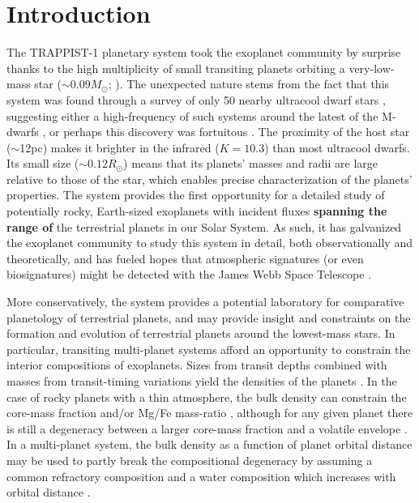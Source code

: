 \documentclass[twocolumn]{aastex63}
\begin{document}



\section{Introduction}

The TRAPPIST-1 planetary system took the exoplanet community by surprise
thanks to the high multiplicity of small transiting planets orbiting a very-low-mass star ($\sim0.09 M_\odot$; \citealt{Gillon2016, Gillon2017, Luger2017a, vanGrootel2018}).
The unexpected nature stems from the fact that this system was found through a survey
of only 50 nearby ultracool dwarf stars \citep{Jehin2011, Gillon2013}, suggesting either a high-frequency of such systems around the latest of the M-dwarfs \citep{He2016}, or perhaps this discovery was fortuitous \citep{Sestovic2020, Sagear2020}.
The proximity of the host star ($\sim$12pc) makes
it brighter in the infrared ($K=10.3$) than most ultracool dwarfs.
Its small size ($\sim 0.12 R_\odot$)
means that its planets' masses and radii are large relative to those of
the star, which enables precise characterization of the planets' properties.
The system provides the first opportunity for a detailed study of potentially
rocky, Earth-sized exoplanets with incident fluxes \textbf{spanning the
range of} the terrestrial
planets in our Solar System.  As such, it has galvanized the exoplanet
community to study this system in detail, both observationally and theoretically,
and has fueled hopes that atmospheric signatures (or even biosignatures) might
be detected with the James Webb Space Telescope \citep{Barstow2016, Morley2017,
    Batalha2018, Krissansen2018, Wunderlich2019, Fauchez2019a, Lustig-Yaeger2019}.

More conservatively, the system provides a potential laboratory
for comparative planetology of terrestrial planets, and may provide insight
and constraints on the formation and evolution of terrestrial planets around
the lowest-mass stars. In particular, transiting multi-planet systems afford
an opportunity to constrain the interior compositions of exoplanets.  Sizes
from transit depths combined  with masses from transit-timing variations yield
the densities of the planets \citep[e.g.][]{Agol2017}. In the case of rocky
planets with a thin atmosphere, the bulk density can constrain the core-mass
fraction and/or Mg/Fe mass-ratio \citep{Valencia2007}, although for any given
planet there is still a degeneracy between a larger core-mass fraction and a
volatile envelope \citep{Dorn2018}.  In a multi-planet system, the bulk density
as a function of planet orbital distance may be used to partly break the compositional
degeneracy by assuming a common refractory composition and a water composition
which increases with orbital distance \citep{Unterborn2018a,Lichtenberg2019}.
\end{document}

